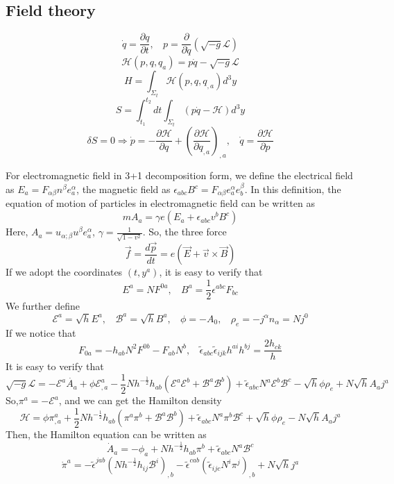 \subsection{Field theory}
\[\dot{q} = \frac{\partial q}{\partial t}, \ \ \ \ p=\frac{\partial}{\partial \dot{q}}(\sqrt{-g} \mathcal{L})\]
\[\mathcal{H}(p,q,q_a) = p\dot{q} - \sqrt{-g} \mathcal{L}\]
\[H = \int_{\Sigma_t} \mathcal{H}(p,q,q_{,a})d^3y\]
\[S = \int_{t_1}^{t_2} dt \int_{\Sigma_t} (p \dot{q} - \mathcal{H} ) d^3 y\]
\[\delta S = 0 \Rightarrow \dot{p} = -\frac{\partial \mathcal{H}}{\partial q} + \left(\frac{\partial \mathcal{H}}{\partial q_{,a}}\right)_{,a}, \ \ \ \ \dot{q} = \frac{\partial \mathcal{H}}{\partial p}\]
\begin{example}
For electromagnetic field in 3+1 decomposition form, we define the electrical field as $E_a = F_{\alpha \beta} n^{\beta} e_a^{\alpha}$, the magnetic field as $\epsilon_{abc} B^c = F_{\alpha \beta} e_a^{\alpha} e_b^{\beta}$. In this definition, the equation of motion of particles in electromagnetic field can be written as
\[m A_a = \gamma e (E_a + \epsilon_{abc} v^b B^c)\]
Here, $A_a = u_{\alpha;\beta} u^{\beta} e_a^{\alpha}$, $\gamma = \frac{1}{\sqrt{1-v^2}}$. So, the three force
\[\vec {f}=\frac{d\vec {p}}{dt} = e(\vec {E} + \vec {v} \times \vec {B})\]
If we adopt the coordinates $(t,y^a)$, it is easy to verify that
\[E^a = N F^{0a}, \ \ \ \ B^a = \frac{1}{2} \epsilon^{abc} F_{bc}\]
We further define
\[\mathcal{E}^a = \sqrt{h} E^a, \ \ \ \ \mathcal{B}^a = \sqrt{h} B^a, \ \ \ \ \phi = - A_0, \ \ \ \ \rho_{e} = -j^{\alpha} n_{\alpha} = N j^0\]
If we notice that
\[F_{0a} = -h_{ab}N^2F^{0b} - F_{ab}N^b, \ \ \ \ \tilde{\epsilon}_{abc} \tilde{\epsilon}_{ijk} h^{ai} h^{bj} = \frac{2h_{ck}}{h}\]
It is easy to verify that
\[ \sqrt{-g} \mathcal{L} = - \mathcal{E}^a \dot{A_a} + \phi \mathcal{E}^a_{,a} - \frac{1}{2} N h^{-\frac{1}{2}} h_{ab} (\mathcal{E}^a \mathcal{E}^b + \mathcal{B}^a \mathcal{B}^b) + \tilde{\epsilon}_{abc}N^a \mathcal{E}^b \mathcal{B}^c -\sqrt{h} \phi \rho_e + N \sqrt{h} A_a j^a\]
So,$\pi^a = -\mathcal{E}^a$, and we can get the Hamilton density
\[\mathcal{H} = \phi \pi^a_{,a} + \frac{1}{2} N h^{-\frac{1}{2}} h_{ab} (\pi^a \pi^b + \mathcal{B}^a \mathcal{B}^b) + \tilde{\epsilon}_{abc}N^a \pi^b \mathcal{B}^c +\sqrt{h} \phi \rho_e - N \sqrt{h} A_a j^a\]
Then, the Hamilton equation can be written as
\[\dot{A}_a = -\phi_a + N h^{-\frac{1}{2}} h_{ab}\pi^b + \tilde{\epsilon}_{abc}N^a \mathcal{B}^c\]
\[\dot{\pi}^a = - \tilde{\epsilon}^{jab}(Nh^{-\frac{1}{2}}h_{ij}\mathcal{B}^i)_{,b} - \tilde{\epsilon}^{cab}(\tilde{\epsilon}_{ijc}N^i \pi^j)_{,b} + N\sqrt{h}j^a \]

\end{example}

